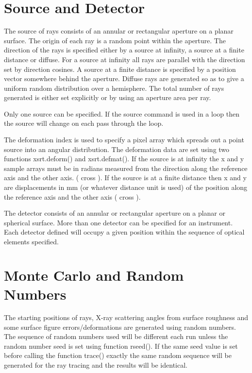 \documentclass[letterpaper,10pt,english]{sphinxmanual}
\begin{document}
\section{Source and Detector}
\label{\detokenize{xsrt_source_detector:source-and-detector}}\label{\detokenize{xsrt_source_detector::doc}}

The source of rays consists of an annular or rectangular aperture on a planar
surface. The origin of each ray is a random point within
the aperture. The direction of the rays is specified either by
a source at infinity, a source at a finite distance or diffuse.
For a source at infinity all rays are parallel with the direction
set by direction cosines. A source at a finite distance is specified
by a position vector somewhere behind the aperture. Diffuse rays
are generated so as to give a uniform random distribution over a hemisphere.
The total number of rays generated is either set explicitly or by
using an aperture area per ray.

Only one source can be specified. If the source command is used in a
loop then the source will change on each pass through the loop.

The deformation index is used to specify a pixel array which spreads
out a point source into an angular distribution. The deformation data are
set using two functions xsrt.deform() and xsrt.defmat().
If the source is at infinity the x and y sample arrays must be in radians
measured from the direction  along the reference axis  and the
other axis.  ( cross ).
If the source is at a finite distance then x and y are displacements
in mm (or whatever distance unit is used) of the position  along
the reference axis  and the other axis ( cross ).


The detector consists of an annular or rectangular aperture on a planar
or spherical surface. More than one detector can be specified for an instrument.
Each detector defined will
occupy a given position within the sequence of optical elements specified.


\section{Monte Carlo and Random Numbers}
\label{\detokenize{xsrt_random:monte-carlo-and-random-numbers}}\label{\detokenize{xsrt_random::doc}}
The starting positions of rays, X-ray scattering angles from surface roughness and
some surface figure errors/deformations are generated using random numbers.
The sequence of random numbers used will be different each run unless the
random number seed is set using function rseed(). If the same seed value is set
before calling the function trace() exactly the same random sequence will be
generated for the ray tracing and the results will be identical.
\end{document}

